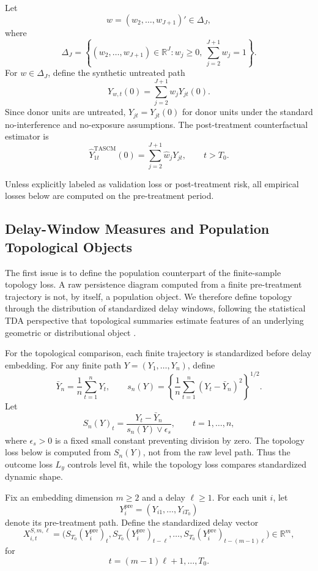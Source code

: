 \documentclass[11pt]{article}
\theoremstyle{plain}
\theoremstyle{definition}
\theoremstyle{remark}
\newcommand{\1}{\mathbbm{1}}
\newcommand{\TASCM}{\mathrm{TASCM}}
\newcommand{\pre}{\mathrm{pre}}
\begin{document}
Let
\[
w=(w_2,\ldots,w_{J+1})'
\in
\Delta_J,
\]
where
\[
\Delta_J
=
\left\{
(w_2,\ldots,w_{J+1})\in\mathbb R^J:
w_j\ge 0,\ 
\sum_{j=2}^{J+1}w_j=1
\right\}.
\]
For \(w\in\Delta_J\), define the synthetic untreated path
\[
Y_{w,t}(0)
=
\sum_{j=2}^{J+1}w_jY_{jt}(0).
\]
Since donor units are untreated, \(Y_{jt}=Y_{jt}(0)\) for donor units under the
standard no-interference and no-exposure assumptions. The post-treatment
counterfactual estimator is
\[
\widehat Y_{1t}^{\TASCM}(0)
=
\sum_{j=2}^{J+1}\widehat w_jY_{jt},
\qquad t>T_0.
\]

Unless explicitly labeled as validation loss or post-treatment risk, all
empirical losses below are computed on the pre-treatment period.

\subsection{Delay-Window Measures and Population Topological Objects}

The first issue is to define the population counterpart of the finite-sample
topology loss. A raw persistence diagram computed from a finite pre-treatment
trajectory is not, by itself, a population object. We therefore define topology
through the distribution of standardized delay windows, following the
statistical TDA perspective that topological summaries estimate features of an
underlying geometric or distributional object \citep{chazal2021introduction}.

For the topological comparison, each finite trajectory is standardized before
delay embedding. For any finite path \(Y=(Y_1,\ldots,Y_n)\), define
\[
\bar Y_n
=
\frac{1}{n}\sum_{t=1}^nY_t,
\qquad
s_n(Y)
=
\left\{
\frac{1}{n}\sum_{t=1}^n(Y_t-\bar Y_n)^2
\right\}^{1/2}.
\]
Let
\[
S_n(Y)_t
=
\frac{Y_t-\bar Y_n}{s_n(Y)\vee \epsilon_s},
\qquad t=1,\ldots,n,
\]
where \(\epsilon_s>0\) is a fixed small constant preventing division by zero.
The topology loss below is computed from \(S_n(Y)\), not from the raw level
path. Thus the outcome loss \(L_y\) controls level fit, while the topology loss
compares standardized dynamic shape.

Fix an embedding dimension \(m\ge2\) and a delay \(\ell\ge1\). For each unit
\(i\), let
\[
Y_i^{\pre}
=
(Y_{i1},\ldots,Y_{iT_0})
\]
denote its pre-treatment path. Define the standardized delay vector
\[
X_{i,t}^{S,m,\ell}
=
\bigl(
S_{T_0}(Y_i^{\pre})_t,
S_{T_0}(Y_i^{\pre})_{t-\ell},
\ldots,
S_{T_0}(Y_i^{\pre})_{t-(m-1)\ell}
\bigr)
\in\mathbb R^m,
\]
for
\[
t=(m-1)\ell+1,\ldots,T_0.
\]
\end{document}
